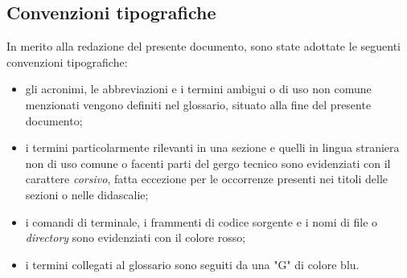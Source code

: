 \subsection{Convenzioni tipografiche}
In merito alla redazione del presente documento, sono state adottate le seguenti
convenzioni tipografiche:
\begin{itemize}
    \item gli acronimi, le abbreviazioni e i termini ambigui o di uso non comune menzionati vengono definiti nel glossario, situato alla fine del presente documento;
    \item i termini particolarmente rilevanti in una sezione e quelli in lingua straniera non di uso comune o facenti parti del gergo tecnico sono evidenziati con il carattere \textit{corsivo}, fatta eccezione per le occorrenze presenti nei titoli delle sezioni o nelle didascalie;
    \item i comandi di terminale, i frammenti di codice sorgente e i nomi di file o \textit{directory} sono evidenziati con il colore rosso;
    \item i termini collegati al glossario sono seguiti da una "G" di colore blu.
\end{itemize}

\newpage
